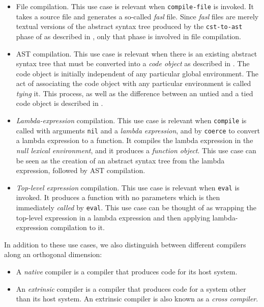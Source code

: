 \begin{itemize}
\item File compilation.  This use case is relevant when
  \texttt{compile-file} is invoked.  It takes a \commonlisp{} source
  file and generates a so-called \emph{fasl} file.  Since \sysname{}
  \emph{fasl} files are merely textual versions of the abstract syntax
  tree produced by the \texttt{cst-to-ast} phase of \cleavir{} as
  described in , only that phase is
  involved in file compilation.

\item AST compilation.  This use case is relevant when there is an
  existing abstract syntax tree that must be converted into a
  \emph{code object} as described in
  .  The code object is
  initially independent of any particular global environment.  The act
  of associating the code object with any particular environment is
  called \emph{tying} it.  This process, as well as the difference
  between an untied and a tied code object is described in
  .

\item \emph{Lambda-expression} compilation.  This use case is relevant
  when \texttt{compile} is called with arguments \texttt{nil} and a
  \emph{lambda expression}, and by \texttt{coerce} to convert a lambda
  expression to a function.  It compiles the lambda expression in the
  \emph{null lexical environment}, and it produces a \emph{function
    object}.  This use case can be seen as the creation of an abstract
  syntax tree from the lambda expression, followed by AST compilation.

\item \emph{Top-level expression} compilation.  This use case is
  relevant when \texttt{eval} is invoked.  It produces a function with
  no parameters which is then immediately \emph{called} by
  \texttt{eval}.  This use case can be thought of as wrapping the
  top-level expression in a lambda expression and then applying
  lambda-expression compilation to it.

\end{itemize}

In addition to these use cases, we also distinguish between different
compilers along an orthogonal dimension:

\begin{itemize}
\item A \emph{native} compiler is a compiler that produces code for
  its host \commonlisp{} system.
\item An \emph{extrinsic} compiler is a compiler that produces code
  for a \commonlisp{} system other than its host system.  An extrinsic
  compiler is also known as a \emph{cross compiler}.
\end{itemize}

